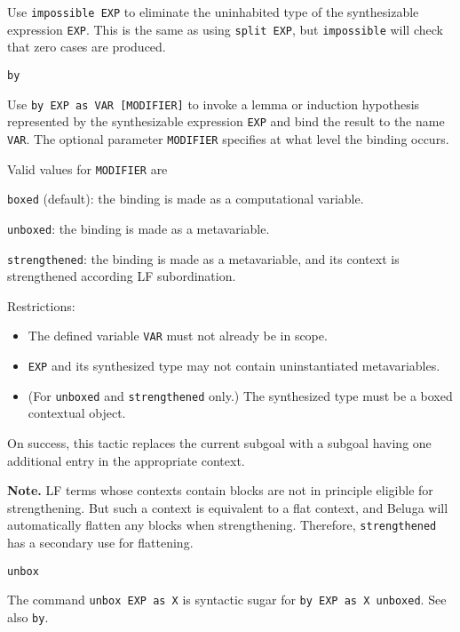 \begin{description}
Use \texttt{impossible EXP} to eliminate the uninhabited type of the synthesizable
expression \texttt{EXP}.
This is the same as using \texttt{split EXP}, but \texttt{impossible} will check that zero
cases are produced.

\item{\texttt{by}}

Use \texttt{by EXP as VAR [MODIFIER]} to invoke a lemma or induction hypothesis
represented by the synthesizable expression \texttt{EXP} and bind the result to the
name \texttt{VAR}.
The optional parameter \texttt{MODIFIER} specifies at what level the binding occurs.

Valid values for \texttt{MODIFIER} are

\begin{description}
\item{\texttt{boxed}} (default): the binding is made as a computational variable.
\item{\texttt{unboxed}}: the binding is made as a metavariable.
\item{\texttt{strengthened}}: the binding is made as a metavariable, and its context is
  strengthened according LF subordination.
\end{description}

Restrictions:
\begin{itemize}
\item The defined variable \texttt{VAR} must not already be in scope.
\item \texttt{EXP} and its synthesized type may not contain uninstantiated
  metavariables.
\item (For \texttt{unboxed} and \texttt{strengthened} only.) The synthesized
  type must be a boxed contextual object.
\end{itemize}

On success, this tactic replaces the current subgoal with a subgoal having one
additional entry in the appropriate context.

\textbf{Note.}
LF terms whose contexts contain blocks are not in principle eligible for
strengthening. But such a context is equivalent to a flat context, and Beluga
will automatically flatten any blocks when strengthening.  Therefore,
\texttt{strengthened} has a secondary use for flattening.

\item{\texttt{unbox}}

The command \texttt{unbox EXP as X} is syntactic sugar for \texttt{by EXP as X unboxed}.
See also \texttt{by}.


\end{description}
